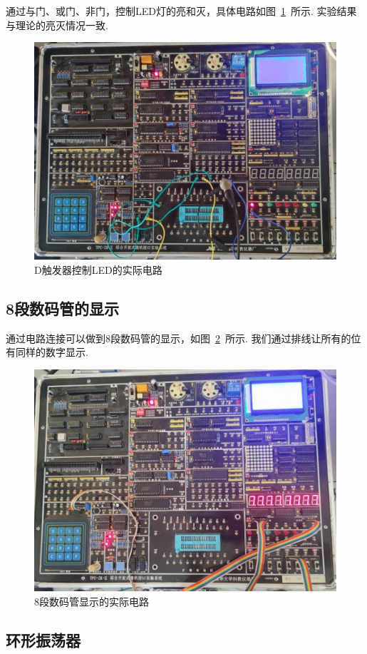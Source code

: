 \documentclass[fontset=windows,11pt]{SEU-Digital-Report}
\begin{document}
            通过与门、或门、非门，控制LED灯的亮和灭，具体电路如图~\ref{fig:LED}~所示.
            实验结果与理论的亮灭情况一致.

            \begin{figure}[htbp]
                \centering
                \includegraphics[width=.6\linewidth]{fig/LED.jpg}
                \caption{D触发器控制LED的实际电路}
                \label{fig:LED}
            \end{figure}

        \subsection{8段数码管的显示}

            通过电路连接可以做到8段数码管的显示，如图~\ref{fig:digit_LED}~所示.
            我们通过排线让所有的位有同样的数字显示.

            \begin{figure}[htbp]
                \centering
                \includegraphics[width=.6\linewidth]{fig/Digit_LED.jpg}
                \caption{8段数码管显示的实际电路}
                \label{fig:digit_LED}
            \end{figure}

        \subsection{环形振荡器}
\end{document}
